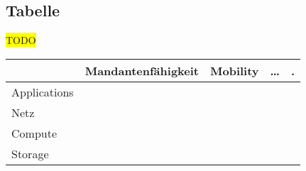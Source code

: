 \documentclass[11pt,titlepage]{article}
\begin{document}
\subsection{Tabelle}
\label{sec:Aufgabe-4_tabelle}
\colorbox{yellow}{TODO}
\begin{tabular}{ |p{2cm}|p{3cm}|p{3cm}|p{3cm}|p{3cm}|  }
  \hline
  & Mandantenfähigkeit & Mobility & … & . \\
  \hline
  Applications & & & & \\
  Netz & & & & \\
  Compute & & & & \\
  Storage & & & & \\
  \hline
\end{tabular}
\end{document}
